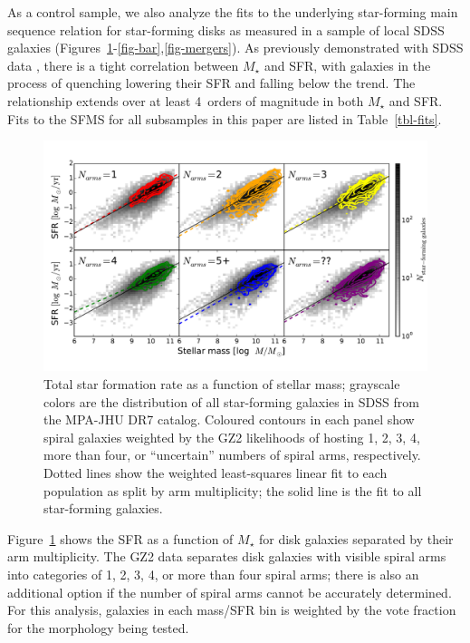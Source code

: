 \documentclass[useAMS,usenatbib]{mn2e}
\begin{document}
As a control sample, we also analyze the fits to the underlying star-forming main sequence relation for star-forming disks as measured in a sample of local SDSS galaxies (Figures~\ref{fig-number}-\ref{fig-bar},\ref{fig-mergers}). As previously demonstrated with SDSS data \citep[e.g.,][]{bri04}, there is a tight correlation between $M_\star$ and SFR, with galaxies in the process of quenching lowering their SFR and falling below the trend. The relationship extends over at least 4~orders of magnitude in both $M_\star$ and SFR. Fits to the SFMS for all subsamples in this paper are listed in Table~\ref{tbl-fits}.

\begin{figure}
\includegraphics[angle=0,width=7.0in]{figures/ms_arms_number_weighted_contour.pdf}
\caption{Total star formation rate as a function of stellar mass; grayscale colors are the distribution of all star-forming galaxies in SDSS from the MPA-JHU DR7 catalog. Coloured contours in each panel show spiral galaxies weighted by the GZ2 likelihoods of hosting 1, 2, 3, 4, more than four, or ``uncertain'' numbers of spiral arms, respectively. Dotted lines show the weighted least-squares linear fit to each population as split by arm multiplicity; the solid line is the fit to all star-forming galaxies. 
\label{fig-number}}
\end{figure}

Figure~\ref{fig-number} shows the SFR as a function of $M_\star$ for disk galaxies separated by their arm multiplicity. The GZ2 data separates disk galaxies with visible spiral arms into categories of 1, 2, 3, 4, or more than four spiral arms; there is also an additional option if the number of spiral arms cannot be accurately determined. For this analysis, galaxies in each mass/SFR bin is weighted by the vote fraction for the morphology being tested. 
\end{document}
